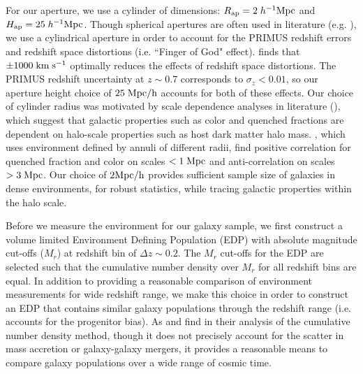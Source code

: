 \documentclass{emulateapj}
\begin{document}
For our aperture, we use a cylinder of dimensions: $R_{\rm{ap}} = 2 \; h^{-1} \rm{Mpc}$ and $H_{\rm{ap}} = 25 \; h^{-1}\rm{Mpc}$. Though spherical apertures are often used in literature (e.g. \citealt{Croton:2005aa}), we use a cylindrical aperture in order to account for the PRIMUS redshift errors and redshift space distortions (i.e. ``Finger of God" effect). \cite{Cooper:2005aa} finds that $\pm 1000 \; \rm{km} \; \rm{s^{-1}}$ optimally reduces the effects of redshift space distortions. The PRIMUS redshift uncertainty at $z \sim 0.7$ corresponds to $\sigma_z < 0.01$, so our aperture height choice of $25 \; \rm{Mpc}/h$ accounts for both of these effects. Our choice of cylinder radius was motivated by scale dependence analyses in literature (\citealt{Blanton:2006aa, Wilman:2010aa, Muldrew:2012aa}), which suggest that galactic properties such as color and quenched fractions are dependent on halo-scale properties such as host dark matter halo mass. \cite{Wilman:2010aa}, which uses environment defined by annuli of different radii, find positive correlation for quenched fraction and color on scales $< 1 \; \rm{Mpc}$ and anti-correlation on scales $> 3 \; \rm{Mpc}$. Our choice of $2 \rm{Mpc}/h$ provides sufficient sample size of galaxies in dense environments, for robust statistics, while tracing galactic properties within the halo scale. 


Before we measure the environment for our galaxy sample, we first construct a volume limited Environment Defining Population (EDP) with absolute magnitude cut-offs ($M_{r}$) at redshift bin of $\Delta z \sim 0.2$. The $M_{r}$ cut-offs for the EDP are selected such that the cumulative number density over $M_{r}$ for all redshift bins are equal. In addition to providing a reasonable comparison of environment measurements for wide redshift range, we make this choice in order to construct an EDP that contains similar galaxy populations through the redshift range (i.e. accounts for the progenitor bias). As \cite{Behroozi:2013aa} and \cite{Leja:2013aa} find in their analysis of the cumulative number density method, though it does not precisely account for the scatter in mass accretion or galaxy-galaxy mergers, it provides a reasonable means to compare galaxy populations over a wide range of cosmic time. 
\end{document}
